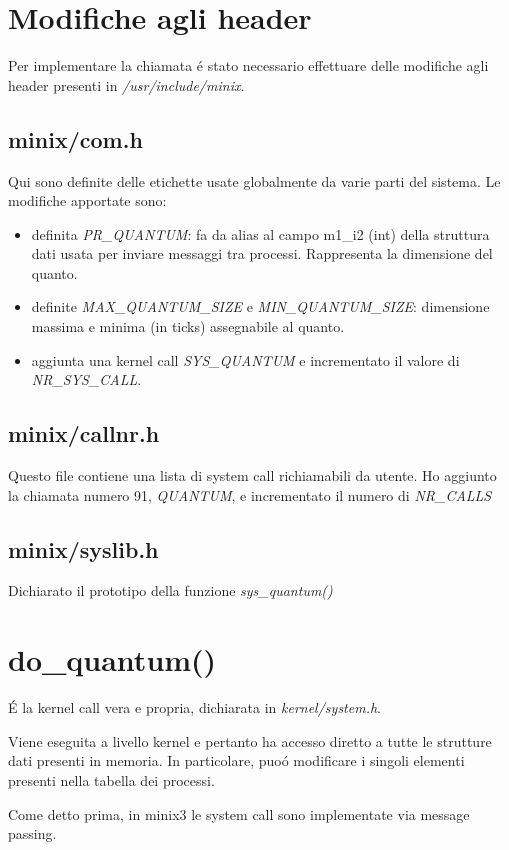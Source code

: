 \documentclass[a4paper,12pt]{report}
\begin{document}
\section{Modifiche agli header}
Per implementare la chiamata \'e stato necessario effettuare delle modifiche
agli header presenti in \textit{/usr/include/minix}.

\subsection{minix/com.h}
Qui sono definite delle etichette usate globalmente da varie parti del
sistema.
Le modifiche apportate sono:
\begin{itemize}
\item definita \textit{PR\_QUANTUM}: fa da alias al campo m1\_i2 (int) della
struttura dati usata per inviare messaggi tra processi. Rappresenta la
dimensione del quanto.
\item definite \textit{MAX\_QUANTUM\_SIZE} e \textit{MIN\_QUANTUM\_SIZE}:
dimensione massima e minima (in ticks) assegnabile al quanto.
\item aggiunta una kernel call \textit{SYS\_QUANTUM} e incrementato il
valore di \textit{NR\_SYS\_CALL}.
\end{itemize}

\subsection{minix/callnr.h}
Questo file contiene una lista di system call 
richiamabili da utente.
Ho aggiunto la chiamata numero 91, \textit{QUANTUM}, e incrementato il
numero di \textit{NR\_CALLS}

\subsection{minix/syslib.h}
Dichiarato il prototipo della funzione \textit{sys\_quantum()}

\section{do\_quantum()}
\'E la kernel call vera e propria, dichiarata in \textit{kernel/system.h}.

Viene eseguita a livello kernel e pertanto ha accesso diretto a tutte le
strutture dati presenti in memoria. In particolare, puo\'o modificare 
i singoli elementi presenti nella tabella dei processi.

Come detto prima, in minix3 le system call sono implementate via message
passing.
\end{document}
